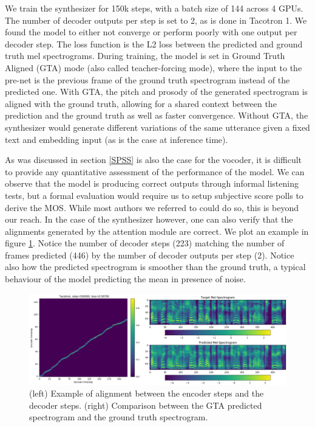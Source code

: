 \documentclass[a4paper, oneside, 12pt, english]{article}
\begin{document}
We train the synthesizer for 150k steps, with a batch size of 144 across 4 GPUs. The number of decoder outputs per step is set to 2, as is done in Tacotron 1. We found the model to either not converge or perform poorly with one output per decoder step. The loss function is the L2 loss between the predicted and ground truth mel spectrograms. During training, the model is set in Ground Truth Aligned (GTA) mode (also called teacher-forcing mode), where the input to the pre-net is the previous frame of the ground truth spectrogram instead of the predicted one. With GTA, the pitch and prosody of the generated spectrogram is aligned with the ground truth, allowing for a shared context between the prediction and the ground truth as well as faster convergence. Without GTA, the synthesizer would generate different variations of the same utterance given a fixed text and embedding input (as is the case at inference time).

As was discussed in section \ref{SPSS} is also the case for the vocoder, it is difficult to provide any quantitative assessment of the performance of the model. We can observe that the model is producing correct outputs through informal listening tests, but a formal evaluation would require us to setup subjective score polls to derive the MOS. While most authors we referred to could do so, this is beyond our reach. In the case of the synthesizer however, one can also verify that the alignments generated by the attention module are correct. We plot an example in figure \ref{tacotron_alignment}. Notice the number of decoder steps (223) matching the number of frames predicted (446) by the number of decoder outputs per step (2). Notice also how the predicted spectrogram is smoother than the ground truth, a typical behaviour of the model predicting the mean in presence of noise.

\begin{figure}[h]
	\centering
	\includegraphics[width=\linewidth]{images/tacotron_alignment.png}
	\caption{(left) Example of alignment between the encoder steps and the decoder steps. (right) Comparison between the GTA predicted spectrogram and the ground truth spectrogram.}
	\label{tacotron_alignment}
\end{figure}
\end{document}
